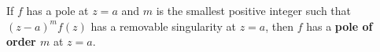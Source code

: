 If $f$ has a pole at $z = a$ and $m$ is the smallest positive integer such that $(z-a)^m f(z)$ has a removable singularity at $z = a$, then $f$ has a \textbf{pole of order $m$} at $z = a$.

